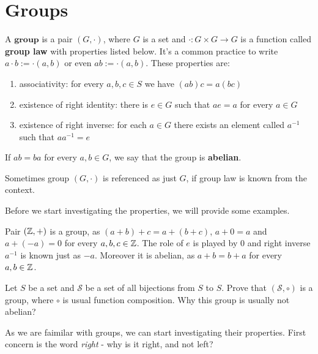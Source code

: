 \chapter{Groups}
\label{groups}

\begin{definition}
  A $\textbf{group}$ is a pair $(G, \cdot)$, where $G$ is a set and $\cdot: G\times G\to G$ is a function called \textbf{group law} with properties listed below. It's a common practice to write $a\cdot b := \cdot(a,b)$ or even $ab := \cdot(a,b)$. These properties are:
  \begin{enumerate}
    \item associativity: for every $a,b,c\in S$ we have $(ab)c=a(bc)$
    \item existence of right identity: there is $e\in G$ such that $ae=a$ for every $a\in G$
    \item existence of right inverse: for each $a\in G$ there exists an element called $a^{-1}$ such that $aa^{-1}=e$
  \end{enumerate}
  If $ab=ba$ for every $a,b\in G$, we say that the group is \textbf{abelian}.

  Sometimes group $(G, \cdot)$ is referenced as just $G$, if group law is known from the context.
\end{definition}

Before we start investigating the properties, we will provide some examples.

\begin{example}
  Pair $(\mathbb Z, +)$ is a group, as $(a+b)+c=a+(b+c)$, $a+0=a$ and $a+(-a)=0$ for every $a,b,c\in \mathbb Z$. The role of $e$ is played by 0 and right inverse $a^{-1}$ is known just as $-a$.
  Moreover it is abelian, as $a+b=b+a$ for every $a,b\in \mathbb Z$.
\end{example}

\begin{exercise}
  Let $S$ be a set and $\mathcal S$ be a set of all bijections from $S$ to $S$. Prove that $(\mathcal S, \circ)$ is a group, where $\circ$ is usual function composition. Why this group is usually not abelian?
\end{exercise}

As we are faimilar with groups, we can start investigating their properties. First concern is the word \emph{right} - why is it right, and not left?

